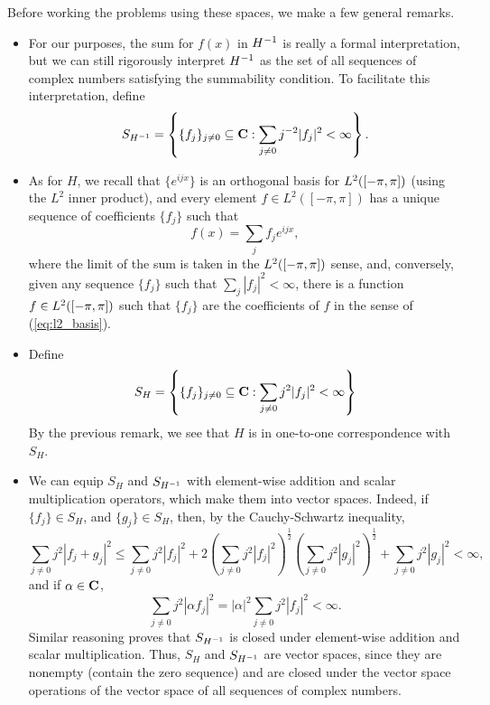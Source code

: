 \documentclass{homework}
\begin{document}
	Before working the problems using these spaces, we make a few general remarks.
	
	\begin{itemize}
		\item For our purposes, the sum for $f(x)$ in ${H^{-1}}$ is really a formal interpretation, but we can still rigorously interpret ${H^{-1}}$ as the set of all sequences of complex numbers satisfying the summability condition. To facilitate this interpretation, define
		\begin{equation}
			\label{eq:hm_seq}
			S_{H^{-1}} = \left\{\{f_j\}_{j\ne 0}\subseteq \textbf{C} : \sum_{j\ne 0}j^{-2}|f_j|^2 < \infty\right\}.
		\end{equation}
		
		\item
		As for $H$, we recall that $\{e^{ijx}\}$ is an orthogonal basis for $L^2([-\pi, \pi])$ (using the $L^2$ inner product), and every element $f \in L^2([-\pi, \pi])$ has a unique sequence of coefficients $\{f_j\}$ such that
		\begin{equation}
			\label{eq:l2_basis}
			f(x) = \sum_{j} f_j e^{ijx},
		\end{equation}
		where the limit of the sum is taken in the $L^2([-\pi, \pi])$ sense, and, conversely, given any sequence $\{f_j\}$ such that $\sum\limits_{j} |f_j|^2 < \infty$, there is a function $f \in L^2([-\pi, \pi])$ such that $\{f_j\}$ are the coefficients of $f$ in the sense of (\ref{eq:l2_basis}).
		
		\item 
		Define
		\begin{equation}
			\label{eq:h_seq}
			S_H = \left\{\{f_j\}_{j\ne 0}\subseteq \textbf{C} : \sum_{j\ne 0} j^2|f_j|^2 < \infty\right\}
		\end{equation}
		By the previous remark, we see that $H$ is in one-to-one correspondence with $S_H$.
		
		\item We can equip $S_H$ and $S_{H^{-1}}$ with element-wise addition and scalar multiplication operators, which make them into vector spaces. Indeed, if $\{f_j\} \in S_H$, and $\{g_j\} \in S_H$, then, by the Cauchy-Schwartz inequality,
		\begin{equation}
			\sum_{j\ne 0} j^2|f_j + g_j|^2 \le \sum_{j\ne0}j^2|f_j|^2 + 2\left(\sum_{j\ne0}j^2|f_j|^2\right)^\frac{1}{2}\left(\sum_{j\ne0}j^2|g_j|^2\right)^\frac{1}{2} + \sum_{j\ne0}j^2|g_j|^2 < \infty,
		\end{equation}
		and if $\alpha \in \textbf{C}$,
		\begin{equation}
			\sum_{j\ne 0}j^2|\alpha f_j|^2 = |\alpha|^2\sum_{j\ne 0}j^2|f_j|^2 < \infty.
		\end{equation}
		Similar reasoning proves that $S_{H^{-1}}$ is closed under element-wise addition and scalar multiplication. Thus, $S_H$ and $S_{H^{-1}}$ are vector spaces, since they are nonempty (contain the zero sequence) and are closed under the vector space operations of the vector space of all sequences of complex numbers.
	\end{itemize}
	
\end{document}

